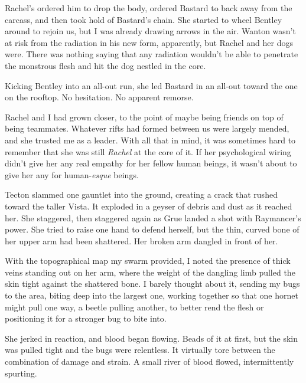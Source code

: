 Rachel's ordered him to drop the body, ordered Bastard to back away from the carcass, and then took hold of Bastard's chain.  She started to wheel Bentley around to rejoin us, but I was already drawing arrows in the air.  Wanton wasn't at risk from the radiation in his new form, apparently, but Rachel and her dogs were.  There was nothing saying that any radiation wouldn't be able to penetrate the monstrous flesh and hit the dog nestled in the core.



Kicking Bentley into an all-out run, she led Bastard in an all-out toward the one on the rooftop.  No hesitation.  No apparent remorse.



Rachel and I had grown closer, to the point of maybe being friends on top of being teammates.  Whatever rifts had formed between us were largely mended, and she trusted me as a leader.  With all that in mind, it was sometimes hard to remember that she was still \emph{Rachel} at the core of it.  If her psychological wiring didn't give her any real empathy for her fellow human beings, it wasn't about to give her any for human-\emph{esque} beings.



Tecton slammed one gauntlet into the ground, creating a crack that rushed toward the taller Vista.  It exploded in a geyser of debris and dust as it reached her.  She staggered, then staggered again as Grue landed a shot with Raymancer's power.  She tried to raise one hand to defend herself, but the thin, curved bone of her upper arm had been shattered.  Her broken arm dangled in front of her.



With the topographical map my swarm provided, I noted the presence of thick veins standing out on her arm, where the weight of the dangling limb pulled the skin tight against the shattered bone.  I barely thought about it, sending my bugs to the area, biting deep into the largest one, working together so that one hornet might pull one way, a beetle pulling another, to better rend the flesh or positioning it for a stronger bug to bite into.



She jerked in reaction, and blood began flowing.  Beads of it at first, but the skin was pulled tight and the bugs were relentless.  It virtually tore between the combination of damage and strain.  A small river of blood flowed, intermittently spurting.



